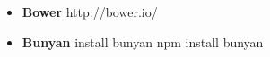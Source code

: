 \begin{itemize}
		
			
		\item
			\textbf{ Bower} http://bower.io/

		\item
			\textbf{ Bunyan} install bunyan
			npm install bunyan
			
	\end{itemize}
